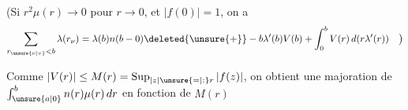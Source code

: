 (Si $r^2\mu(r)\to0$ pour $r\to0$, et $|f(0)|=1$, on a
\[ \sum_{r_{\unsure{\nu|v}}<b}\lambda(r_\nu)=\lambda(b)n(b-0)\deleted{\unsure{+}}-b\lambda'(b)V(b)+\int_0^b V(r)\,d(r\lambda'(r))\quad\big) \]

Comme $|V(r)|\leq M(r)=\mathop{\rm Sup}_{|z|\unsure{=|:}r}|f(z)|$, on obtient une
majoration de  $\int_{\unsure{a|0}}^b n(r)\mu(r)\,dr$ en fonction
de $M(r)$
